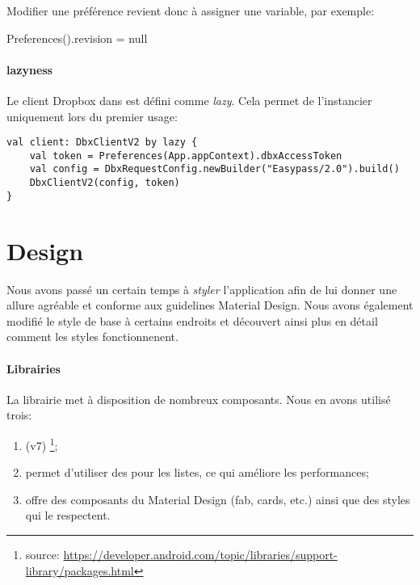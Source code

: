Modifier une préférence revient donc à assigner une variable, par exemple:

\begin{kotlincode}
Preferences().revision = null
\end{kotlincode}

\paragraph*{lazyness} Le client Dropbox dans  est défini comme \emph{lazy}. Cela permet de l'instancier uniquement lors du premier usage:

\begin{verbatim}
val client: DbxClientV2 by lazy {
    val token = Preferences(App.appContext).dbxAccessToken
    val config = DbxRequestConfig.newBuilder("Easypass/2.0").build()
    DbxClientV2(config, token)
}
\end{verbatim}



\section{Design}

Nous avons passé un certain temps à \emph{styler} l'application afin de lui donner une allure agréable et conforme aux guidelines Material Design. Nous avons également modifié le style de base à certains endroits et découvert ainsi plus en détail comment les styles fonctionnenent.

\paragraph*{Librairies} La librairie  met à disposition de nombreux composants. Nous en avons utilisé trois:
\begin{enumerate}
    \item {} (v7) \footnote{source: \url{https://developer.android.com/topic/libraries/support-library/packages.html}};
    \item {} permet d'utiliser des  pour les listes, ce qui améliore les performances;
    \item {} offre des composants du Material Design (fab, cards, etc.) ainsi que des styles qui le respectent.
\end{enumerate}

